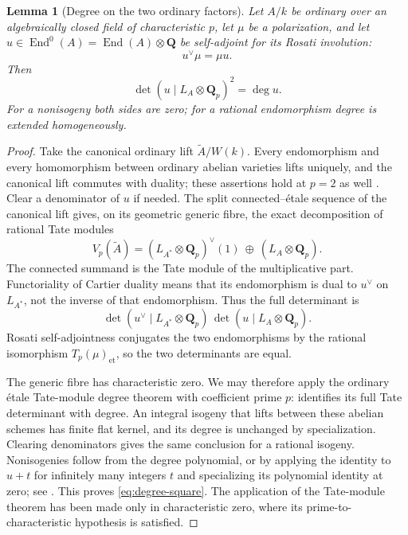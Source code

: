 \documentclass[11pt]{article}
\newtheorem{lemma}[theorem]{Lemma}
\theoremstyle{definition}\newtheorem{definition}[theorem]{Definition}
\theoremstyle{remark}\newtheorem{remark}[theorem]{Remark}
\newcommand{\QQ}{\mathbf Q}
\newcommand{\et}{\mathrm{et}}
\newcommand{\End}{\operatorname{End}}
\begin{document}
\begin{lemma}[Degree on the two ordinary factors]\label{lem:degree}
Let $A/k$ be ordinary over an algebraically closed field of characteristic $p$, let $\mu$ be a polarization, and let $u\in\End^0(A)=\End(A)\otimes\QQ$ be self-adjoint for its Rosati involution:
\[
 u^\vee\mu=\mu u.
\]
Then
\begin{equation}\label{eq:degree-square}
 \det(u\mid L_A\otimes\QQ_p)^2=\deg u.
\end{equation}
For a nonisogeny both sides are zero; for a rational endomorphism degree is extended homogeneously.
\end{lemma}
\begin{proof}
Take the canonical ordinary lift $\widetilde A/W(k)$. Every endomorphism and every homomorphism between ordinary abelian varieties lifts uniquely, and the canonical lift commutes with duality; these assertions hold at $p=2$ as well \citep[Theorem~1.4 and following paragraph, p.~115]{DworkOgus}. Clear a denominator of $u$ if needed. The split connected--\'etale sequence of the canonical lift gives, on its geometric generic fibre, the exact decomposition of rational Tate modules
\[
 V_p(\widetilde A)=
 (L_{A^*}\otimes\QQ_p)^{\vee}(1)\ \oplus\ (L_A\otimes\QQ_p).
\]
The connected summand is the Tate module of the multiplicative part. Functoriality of Cartier duality means that its endomorphism is dual to $u^\vee$ on $L_{A^*}$, not the inverse of that endomorphism. Thus the full determinant is
\[
 \det(u^\vee\mid L_{A^*}\otimes\QQ_p)\,
 \det(u\mid L_A\otimes\QQ_p).
\]
Rosati self-adjointness conjugates the two endomorphisms by the rational isomorphism $T_p(\mu)_{\et}$, so the two determinants are equal.

The generic fibre has characteristic zero. We may therefore apply the ordinary \'etale Tate-module degree theorem with coefficient prime $p$: \citet[Theorem~12.18 and proof, pp.~186--187]{EGM} identifies its full Tate determinant with degree. An integral isogeny that lifts between these abelian schemes has finite flat kernel, and its degree is unchanged by specialization. Clearing denominators gives the same conclusion for a rational isogeny. Nonisogenies follow from the degree polynomial, or by applying the identity to $u+t$ for infinitely many integers $t$ and specializing its polynomial identity at zero; see \citet[Proposition~12.15 and Definition~12.16, p.~185]{EGM}. This proves \eqref{eq:degree-square}. The application of the Tate-module theorem has been made only in characteristic zero, where its prime-to-characteristic hypothesis is satisfied.
\end{proof}
\end{document}
